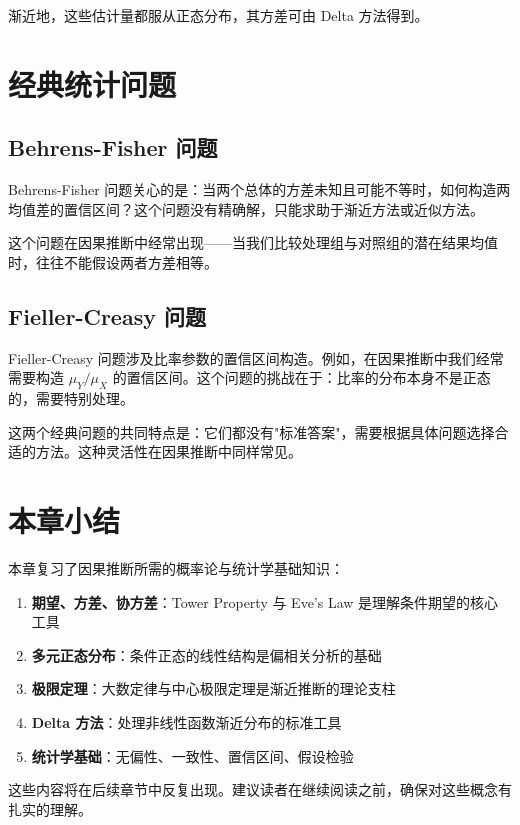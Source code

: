 渐近地，这些估计量都服从正态分布，其方差可由 Delta 方法得到。

\section{经典统计问题}

\subsection{Behrens-Fisher 问题}

Behrens-Fisher 问题关心的是：当两个总体的方差未知且可能不等时，如何构造两均值差的置信区间？这个问题没有精确解，只能求助于渐近方法或近似方法。

这个问题在因果推断中经常出现——当我们比较处理组与对照组的潜在结果均值时，往往不能假设两者方差相等。

\subsection{Fieller-Creasy 问题}

Fieller-Creasy 问题涉及比率参数的置信区间构造。例如，在因果推断中我们经常需要构造 $\mu_Y/\mu_X$ 的置信区间。这个问题的挑战在于：比率的分布本身不是正态的，需要特别处理。

这两个经典问题的共同特点是：它们都没有"标准答案"，需要根据具体问题选择合适的方法。这种灵活性在因果推断中同样常见。

\section{本章小结}

本章复习了因果推断所需的概率论与统计学基础知识：

\begin{enumerate}
  \item \textbf{期望、方差、协方差}：Tower Property 与 Eve's Law 是理解条件期望的核心工具
  \item \textbf{多元正态分布}：条件正态的线性结构是偏相关分析的基础
  \item \textbf{极限定理}：大数定律与中心极限定理是渐近推断的理论支柱
  \item \textbf{Delta 方法}：处理非线性函数渐近分布的标准工具
  \item \textbf{统计学基础}：无偏性、一致性、置信区间、假设检验
\end{enumerate}

这些内容将在后续章节中反复出现。建议读者在继续阅读之前，确保对这些概念有扎实的理解。

